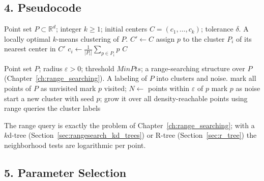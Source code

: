 \subsection{4. Pseudocode}

\begin{algorithm}[htbp]
\caption{$k$-Means via Lloyd Iteration}
\label{alg:data_ml_kmeans}
\begin{algorithmic}[1]
\Require Point set $P \subset \mathbb{R}^d$; integer $k \geq 1$; initial centers $C = (c_1, \dots, c_k)$; tolerance $\delta$.
\Ensure A locally optimal $k$-means clustering of $P$.
  \Repeat
    \State $C' \gets C$
     assign $p$ to the cluster $P_i$ of its nearest center in $C'$ \EndFor
      \State $c_i \gets \frac{1}{|P_i|}\sum_{p \in P_i} p$ 
    \EndFor
  \State \Return $C$
\EndFunction
\end{algorithmic}
\end{algorithm}

\begin{algorithm}[htbp]
\caption{DBSCAN}
\label{alg:data_ml_dbscan}
\begin{algorithmic}[1]
\Require Point set $P$; radius $\varepsilon > 0$; threshold $\mathit{MinPts}$; a range-searching structure over $P$ (Chapter~\ref{ch:range_searching}).
\Ensure A labeling of $P$ into clusters and noise.
  \State mark all points of $P$ as unvisited
      \State mark $p$ visited; $N \gets$ points within $\varepsilon$ of $p$
        \State mark $p$ as noise
      \Else
        \State start a new cluster with seed $p$; grow it over all
               density-reachable points using range queries
      \EndIf
    \EndIf
  \EndFor
  \State \Return the cluster labels
\EndFunction
\end{algorithmic}
\end{algorithm}

The range query is exactly the problem of Chapter~\ref{ch:range_searching};
with a $k$d-tree (Section~\ref{sec:rangesearch_kd_trees}) or R-tree
(Section~\ref{sec:r_tree}) the neighborhood tests are logarithmic per point.

\subsection{5. Parameter Selection}

